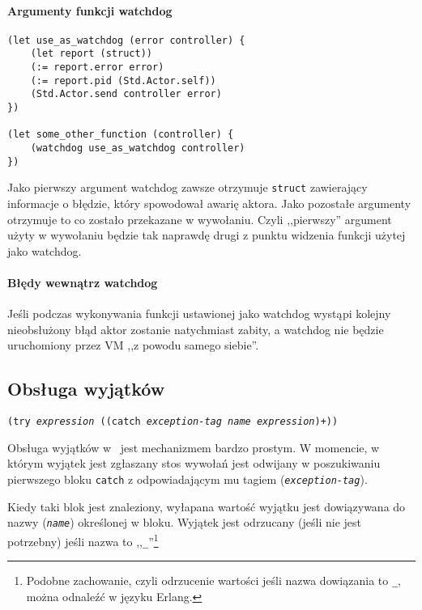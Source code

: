 \paragraph*{Argumenty funkcji watchdog}

\begin{lstlisting}
(let use_as_watchdog (error controller) {
    (let report (struct))
    (:= report.error error)
    (:= report.pid (Std.Actor.self))
    (Std.Actor.send controller error)
})

(let some_other_function (controller) {
    (watchdog use_as_watchdog controller)
})
\end{lstlisting}

Jako pierwszy argument watchdog zawsze otrzymuje \texttt{struct} zawierający informacje o błędzie, który
spowodował awarię aktora. Jako pozostałe argumenty otrzymuje to co zostało przekazane w wywołaniu.
Czyli ,,pierwszy'' argument użyty w wywołaniu będzie tak naprawdę drugi z punktu widzenia funkcji użytej jako
watchdog.

\paragraph*{Błędy wewnątrz watchdog}

Jeśli podczas wykonywania funkcji ustawionej jako watchdog wystąpi kolejny nieobsłużony błąd aktor zostanie
natychmiast zabity, a watchdog nie będzie uruchomiony przez VM ,,z powodu samego siebie''.

\subsection{Obsługa wyjątków}

\texttt{(try \emph{expression} ((catch \emph{exception-tag} \emph{name} \emph{expression})+))}
\vspace{1em}

Obsługa wyjątków w \ViuAct\ jest mechanizmem bardzo prostym. W momencie, w którym wyjątek jest zgłaszany
stos wywołań jest odwijany w poszukiwaniu pierwszego bloku \texttt{catch} z odpowiadającym mu
tagiem (\texttt{\emph{exception-tag}}).

Kiedy taki blok jest znaleziony, wyłapana wartość wyjątku jest dowiązywana do nazwy (\texttt{\emph{name}})
określonej w bloku. Wyjątek jest odrzucany (jeśli nie jest potrzebny) jeśli nazwa to
,,\texttt{\_}''\footnote{Podobne zachowanie, czyli odrzucenie wartości jeśli nazwa dowiązania to
\texttt{\_}, można odnaleźć w języku Erlang.}

